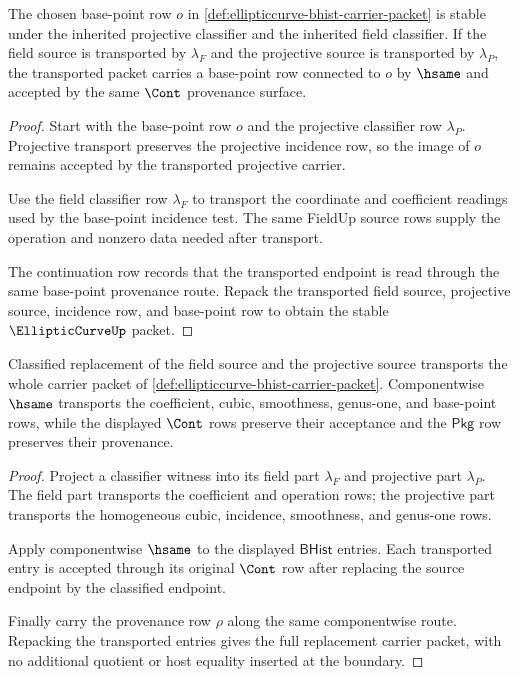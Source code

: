 \begin{theorem}
\label{thm:ellipticcurve-basepoint-stability-obligation}
The chosen base-point row $o$ in \autoref{def:ellipticcurve-bhist-carrier-packet} is stable under the inherited projective classifier and the inherited field classifier. If the field source is transported by $\lambda_F$ and the projective source is transported by $\lambda_P$, the transported packet carries a base-point row connected to $o$ by $\hsame$ and accepted by the same $\Cont$ provenance surface.
\end{theorem}
\begin{proof}
Start with the base-point row $o$ and the projective classifier row $\lambda_P$. Projective transport preserves the projective incidence row, so the image of $o$ remains accepted by the transported projective carrier.

Use the field classifier row $\lambda_F$ to transport the coordinate and coefficient readings used by the base-point incidence test. The same FieldUp source rows supply the operation and nonzero data needed after transport.

The continuation row records that the transported endpoint is read through the same base-point provenance route. Repack the transported field source, projective source, incidence row, and base-point row to obtain the stable $\EllipticCurveUp$ packet.
\end{proof}

\begin{theorem}
\label{thm:ellipticcurve-classifier-transport-obligation}
Classified replacement of the field source and the projective source transports the whole carrier packet of \autoref{def:ellipticcurve-bhist-carrier-packet}. Componentwise $\hsame$ transports the coefficient, cubic, smoothness, genus-one, and base-point rows, while the displayed $\Cont$ rows preserve their acceptance and the $\mathsf{Pkg}$ row preserves their provenance.
\end{theorem}
\begin{proof}
Project a classifier witness into its field part $\lambda_F$ and projective part $\lambda_P$. The field part transports the coefficient and operation rows; the projective part transports the homogeneous cubic, incidence, smoothness, and genus-one rows.

Apply componentwise $\hsame$ to the displayed $\mathsf{BHist}$ entries. Each transported entry is accepted through its original $\Cont$ row after replacing the source endpoint by the classified endpoint.

Finally carry the provenance row $\rho$ along the same componentwise route. Repacking the transported entries gives the full replacement carrier packet, with no additional quotient or host equality inserted at the boundary.
\end{proof}

